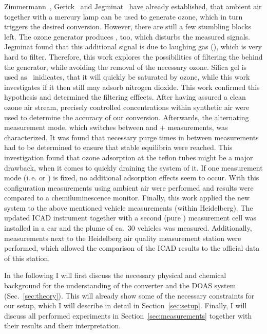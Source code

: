 Zimmermann~\cite{zimmermann}, Gerick~\cite{gerick} and
Jegminat~\cite{bsc} have already established, that ambient air
together with a mercury lamp can be used to generate ozone, which in
turn triggers the desired conversion. However, there are still a few
stumbling blocks left. The ozone generator produces , too,
which disturbs the measured  signals. Jegminat found that
this additional signal is due to laughing gas (), which is
very hard to filter. Therefore, this work explores the possibilities
of filtering the  behind the generator, while avoiding the
removal of the necessary ozone. Silica gel is used
as~\cite{ozone-silica} inidicates, that it will quickly be saturated
by ozone, while this work investigates if it then still may adsorb
nitrogen dioxide. This work confirmed this hypothesis and determined
the filtering efffects. After having assured a clean ozone air stream,
precisely controlled  concentrations within synthetic air were
used to determine the accuracy of our conversion. Afterwards, the
alternating measurement mode, which switches between  and
+ measurements, was characterized. It was found that
necessary purge times in between measurements had to be determined to
ensure that stable equilibria were reached. This investigation found
that ozone adsorption at the teflon tubes might be a major drawback,
when it comes to quickly draining the system of it. If one measurement
mode (i.\,e.  or ) is fixed, no additional adsorption
effects seem to occur. With this configuration measurements using
ambient air were performed and results were compared to a
chemiluminescence monitor. Finally, this work applied the new system
to the above mentioned vehicle measurements (within Heidelberg). The
updated ICAD instrument together with a second (pure )
measurement cell was installed in a car and the plume of ca.~30
vehicles was measured. Additionally, measurements next to the
Heidelberg air quality measurement station were performed, which
allowed the comparison of the ICAD results to the official data of
this station.

In the following I will first discuss the necessary physical and
chemical background for the understanding of the converter and the
DOAS system (Sec.~\ref{sec:theory}). This will already show some of
the necessary constraints for our setup, which I will describe in
detail in Section~\ref{sec:setup}. Finally, I will discuss all
performed experiments in Section~\ref{sec:measurements} together with
their results and their interpretation.

